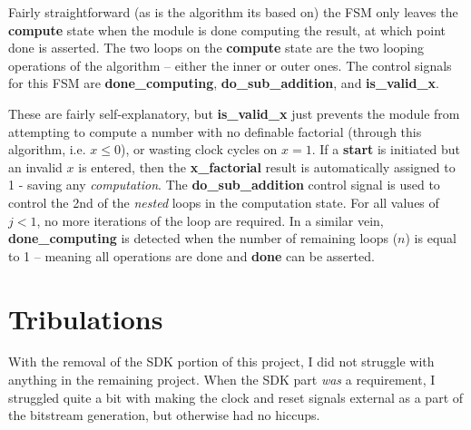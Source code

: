 \documentclass[a4paper, 12pt]{article}
\begin{document}
Fairly straightforward (as is the algorithm its based on) the FSM only leaves the \textbf{compute} state when the module is done computing the result, at which point done is asserted. The two loops on the \textbf{compute} state are the two looping operations of the algorithm -- either the inner or outer ones. The control signals for this FSM are \textbf{done\_computing}, \textbf{do\_sub\_addition}, and \textbf{is\_valid\_x}.

These are fairly self-explanatory, but \textbf{is\_valid\_x} just prevents the module from attempting to compute a number with no definable factorial (through this algorithm, i.e. $x\leq 0$), or wasting clock cycles on $x=1$. If a \textbf{start} is initiated but an invalid $x$ is entered, then the \textbf{x\_factorial} result is automatically assigned to 1 - saving any \textit{computation}. The \textbf{do\_sub\_addition} control signal is used to control the 2nd of the \textit{nested} loops in the computation state. For all values of $j <1$, no more iterations of the loop are required. In a similar vein, \textbf{done\_computing} is detected when the number of remaining loops ($n$) is equal to 1 -- meaning all operations are done and \textbf{done} can be asserted.

\section{Tribulations}
\label{sec:tribulations}
With the removal of the SDK portion of this project, I did not struggle with anything in the remaining project. When the SDK part \textit{was} a requirement, I struggled quite a bit with making the clock and reset signals external as a part of the bitstream generation, but otherwise had no hiccups.
\end{document}
